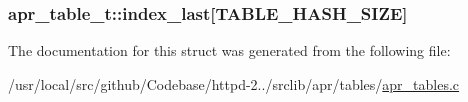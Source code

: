 \subsubsection[{\texorpdfstring{index\+\_\+last}{index_last}}]{ apr\+\_\+table\+\_\+t\+::index\+\_\+last\mbox{[}{\bf T\+A\+B\+L\+E\+\_\+\+H\+A\+S\+H\+\_\+\+S\+I\+ZE}\mbox{]}}\hypertarget{structapr__table__t_a3047719ed68d7a329705aab5faee819c}{}\label{structapr__table__t_a3047719ed68d7a329705aab5faee819c}


The documentation for this struct was generated from the following file\+:\begin{DoxyCompactItemize}
\item 
/usr/local/src/github/\+Codebase/httpd-\/2../srclib/apr/tables/\hyperlink{apr__tables_8c}{apr\+\_\+tables.\+c}\end{DoxyCompactItemize}
